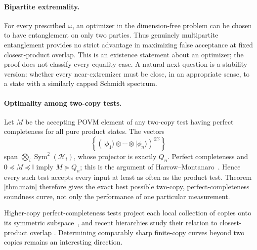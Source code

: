 \documentclass[11pt]{article}
\theoremstyle{definition}
\theoremstyle{remark}
\newcommand{\id}{\mathsf{I}}
\newcommand{\ket}[1]{\lvert #1\rangle}
\begin{document}
\paragraph{Bipartite extremality.}
For every prescribed $\omega$, an optimizer in the dimension-free problem
can be chosen to have entanglement on only two parties.  Thus genuinely
multipartite entanglement provides no strict advantage in maximizing false
acceptance at fixed closest-product overlap.  This is an existence
statement about an optimizer; the proof does not classify every equality
case.  A natural next question is a stability version: whether every
near-extremizer must be close, in an appropriate sense, to a state with a
similarly capped Schmidt spectrum.

\paragraph{Optimality among two-copy tests.}
Let $M$ be the accepting POVM element of any two-copy test having perfect
completeness for all pure product states.  The vectors
\[
  \left\{
    (\ket{\phi_1}\otimes\cdots\otimes\ket{\phi_n})^{\otimes2}
  \right\}
\]
span $\bigotimes_i\operatorname{Sym}^2(\mathcal H_i)$, whose projector is
exactly $Q_n$.  Perfect completeness and $0\preceq M\preceq\id$ imply
$M\succeq Q_n$; this is the argument of
Harrow--Montanaro~\cite[Section~5]{HarrowMontanaro13}.  Hence every such
test accepts every input at least as often as the product test.  Theorem
\ref{thm:main} therefore gives the exact best possible two-copy,
perfect-completeness soundness curve, not only the performance of one
particular measurement.

Higher-copy perfect-completeness tests project each local collection of
copies onto its symmetric subspace~\cite{HarrowMontanaro13}, and recent
hierarchies study their relation to closest-product overlap
\cite{WeinbrennerEtAl26}.  Determining comparably sharp finite-copy curves
beyond two copies remains an interesting direction.



\end{document}
